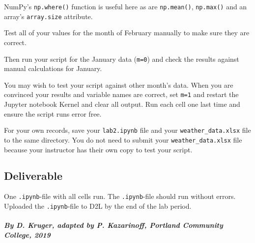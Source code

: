 \documentclass[11pt]{article}
\begin{document}
NumPy's \texttt{np.where()} function is useful here as are
\texttt{np.mean()}, \texttt{np.max()} and an array's \texttt{array.size}
attribute.

    Test all of your values for the month of February manually to make sure
they are correct.

Then run your script for the January data (\texttt{m=0}) and check the
results against manual calculations for January.

You may wish to test your script against other month's data. When you
are convinced your results and variable names are correct, set
\texttt{m=1} and restart the Jupyter notebook Kernel and clear all
output. Run each cell one last time and ensure the script runs error
free.

For your own records, save your \texttt{lab2.ipynb} file and your
\texttt{weather\_data.xlsx} file to the same directory. You do not need
to submit your \texttt{weather\_data.xlsx} file because your instructor
has their own copy to test your script.

    \hypertarget{deliverable}{%
\subsection{Deliverable}\label{deliverable}}

One \texttt{.ipynb}-file with all cells run. The \texttt{.ipynb}-file
should run without errors. Uploaded the \texttt{.ipynb}-file to D2L by
the end of the lab period.

    \hypertarget{by-d.-kruger-adapted-by-p.-kazarinoff-portland-community-college-2019}{%
\paragraph{\texorpdfstring{\emph{By D. Kruger, adapted by P. Kazarinoff,
Portland Community College,
2019}}{By D. Kruger, adapted by P. Kazarinoff, Portland Community College, 2019}}\label{by-d.-kruger-adapted-by-p.-kazarinoff-portland-community-college-2019}}


    
    
    
    
\end{document}
